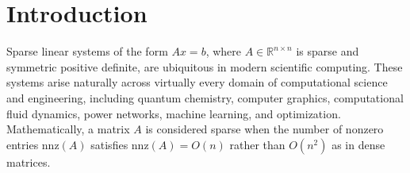 \chapter{Introduction}
\label{ch:introduction}



Sparse linear systems of the form $Ax = b$, where $A \in \mathbb{R}^{n \times n}$ is sparse and symmetric positive definite, are ubiquitous in modern scientific computing. These systems arise naturally across virtually every domain of computational science and engineering, including quantum chemistry, computer graphics, computational fluid dynamics, power networks, machine learning, and optimization. Mathematically, a matrix $A$ is considered sparse when the number of nonzero entries $\text{nnz}(A)$ satisfies $\text{nnz}(A) = O(n)$ rather than $O(n^2)$ as in dense matrices.

